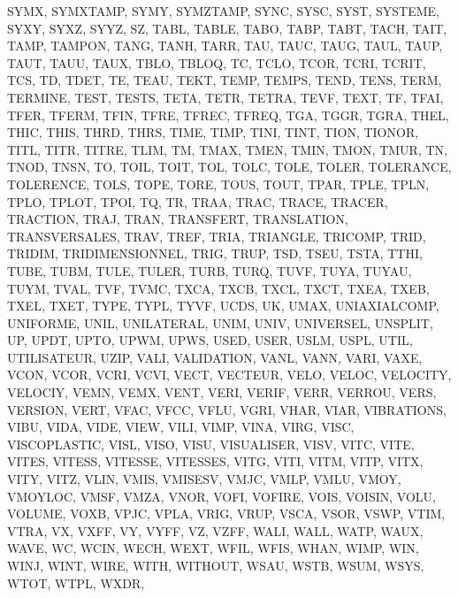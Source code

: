 {{{		SYMX,
		SYMXTAMP,
		SYMY,
		SYMZTAMP,
		SYNC,
		SYSC,
		SYST,
		SYSTEME,
		SYXY,
		SYXZ,
		SYYZ,
		SZ,
		TABL,
		TABLE,
		TABO,
		TABP,
		TABT,
		TACH,
		TAIT,
		TAMP,
		TAMPON,
		TANG,
		TANH,
		TARR,
		TAU,
		TAUC,
		TAUG,
		TAUL,
		TAUP,
		TAUT,
		TAUU,
		TAUX,
		TBLO,
		TBLOQ,
		TC,
		TCLO,
		TCOR,
		TCRI,
		TCRIT,
		TCS,
		TD,
		TDET,
		TE,
		TEAU,
		TEKT,
		TEMP,
		TEMPS,
		TEND,
		TENS,
		TERM,
		TERMINE,
		TEST,
		TESTS,
		TETA,
		TETR,
		TETRA,
		TEVF,
		TEXT,
		TF,
		TFAI,
		TFER,
		TFERM,
		TFIN,
		TFRE,
		TFREC,
		TFREQ,
		TGA,
		TGGR,
		TGRA,
		THEL,
		THIC,
		THIS,
		THRD,
		THRS,
		TIME,
		TIMP,
		TINI,
		TINT,
		TION,
		TIONOR,
		TITL,
		TITR,
		TITRE,
		TLIM,
		TM,
		TMAX,
		TMEN,
		TMIN,
		TMON,
		TMUR,
		TN,
		TNOD,
		TNSN,
		TO,
		TOIL,
		TOIT,
		TOL,
		TOLC,
		TOLE,
		TOLER,
		TOLERANCE,
		TOLERENCE,
		TOLS,
		TOPE,
		TORE,
		TOUS,
		TOUT,
		TPAR,
		TPLE,
		TPLN,
		TPLO,
		TPLOT,
		TPOI,
		TQ,
		TR,
		TRAA,
		TRAC,
		TRACE,
		TRACER,
		TRACTION,
		TRAJ,
		TRAN,
		TRANSFERT,
		TRANSLATION,
		TRANSVERSALES,
		TRAV,
		TREF,
		TRIA,
		TRIANGLE,
		TRICOMP,
		TRID,
		TRIDIM,
		TRIDIMENSIONNEL,
		TRIG,
		TRUP,
		TSD,
		TSEU,
		TSTA,
		TTHI,
		TUBE,
		TUBM,
		TULE,
		TULER,
		TURB,
		TURQ,
		TUVF,
		TUYA,
		TUYAU,
		TUYM,
		TVAL,
		TVF,
		TVMC,
		TXCA,
		TXCB,
		TXCL,
		TXCT,
		TXEA,
		TXEB,
		TXEL,
		TXET,
		TYPE,
		TYPL,
		TYVF,
		UCDS,
		UK,
		UMAX,
		UNIAXIALCOMP,
		UNIFORME,
		UNIL,
		UNILATERAL,
		UNIM,
		UNIV,
		UNIVERSEL,
		UNSPLIT,
		UP,
		UPDT,
		UPTO,
		UPWM,
		UPWS,
		USED,
		USER,
		USLM,
		USPL,
		UTIL,
		UTILISATEUR,
		UZIP,
		VALI,
		VALIDATION,
		VANL,
		VANN,
		VARI,
		VAXE,
		VCON,
		VCOR,
		VCRI,
		VCVI,
		VECT,
		VECTEUR,
		VELO,
		VELOC,
		VELOCITY,
		VELOCIY,
		VEMN,
		VEMX,
		VENT,
		VERI,
		VERIF,
		VERR,
		VERROU,
		VERS,
		VERSION,
		VERT,
		VFAC,
		VFCC,
		VFLU,
		VGRI,
		VHAR,
		VIAR,
		VIBRATIONS,
		VIBU,
		VIDA,
		VIDE,
		VIEW,
		VILI,
		VIMP,
		VINA,
		VIRG,
		VISC,
		VISCOPLASTIC,
		VISL,
		VISO,
		VISU,
		VISUALISER,
		VISV,
		VITC,
		VITE,
		VITES,
		VITESS,
		VITESSE,
		VITESSES,
		VITG,
		VITI,
		VITM,
		VITP,
		VITX,
		VITY,
		VITZ,
		VLIN,
		VMIS,
		VMISESV,
		VMJC,
		VMLP,
		VMLU,
		VMOY,
		VMOYLOC,
		VMSF,
		VMZA,
		VNOR,
		VOFI,
		VOFIRE,
		VOIS,
		VOISIN,
		VOLU,
		VOLUME,
		VOXB,
		VPJC,
		VPLA,
		VRIG,
		VRUP,
		VSCA,
		VSOR,
		VSWP,
		VTIM,
		VTRA,
		VX,
		VXFF,
		VY,
		VYFF,
		VZ,
		VZFF,
		WALI,
		WALL,
		WATP,
		WAUX,
		WAVE,
		WC,
		WCIN,
		WECH,
		WEXT,
		WFIL,
		WFIS,
		WHAN,
		WIMP,
		WIN,
		WINJ,
		WINT,
		WIRE,
		WITH,
		WITHOUT,
		WSAU,
		WSTB,
		WSUM,
		WSYS,
		WTOT,
		WTPL,
		WXDR,
}}}
